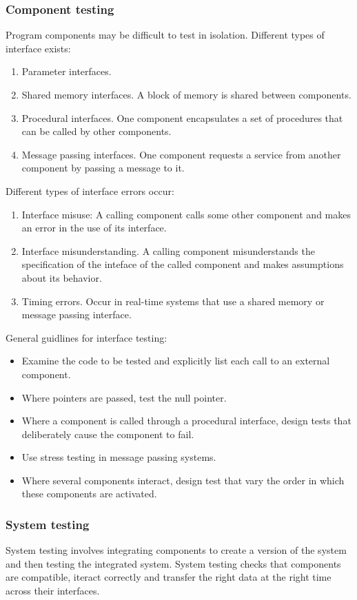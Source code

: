 \documentclass{article}
\begin{document}
\subsubsection{Component testing}
Program components may be difficult to test in isolation.  Different types of interface exists:
\begin{enumerate}
    \item Parameter interfaces. 
    \item Shared memory interfaces.  A block of memory is shared between components.
    \item Procedural interfaces.  One component encapsulates a set of procedures that can be called by other components.
    \item Message passing interfaces.  One component requests a service from another component by passing a message to it.
\end{enumerate}
Different types of interface errors occur:
\begin{enumerate}
    \item Interface misuse:  A calling component calls some other component and makes an error in the use of its interface.
    \item Interface misunderstanding.  A calling component misunderstands the specification of the inteface of the called component and makes assumptions about its behavior.
    \item Timing errors.  Occur in real-time systems that use a shared memory or message passing interface.
\end{enumerate}
General guidlines for interface testing:
\begin{itemize}
    \item Examine the code to be tested and explicitly list each call to an external component.
    \item Where pointers are passed, test the null pointer.
    \item Where a component is called through a procedural interface, design tests that deliberately cause the component to fail.
    \item Use stress testing in message passing systems.
    \item Where several components interact, design test that vary the order in which these components are activated.
\end{itemize}
\subsubsection{System testing}
System testing involves integrating components to create a version of the system and then testing the integrated system.  System testing checks that components are compatible, iteract correctly and transfer the right data at the right time across their interfaces.
\end{document}
